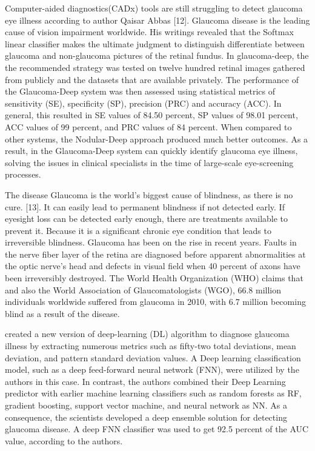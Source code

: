 \vspace{5mm}
\noindent Computer-aided diagnostics(CADx) tools are still struggling to detect glaucoma eye illness according to author Qaisar Abbas [12]. Glaucoma disease is the leading cause of vision impairment worldwide. His writings revealed that the Softmax linear classifier makes the ultimate judgment to distinguish differentiate between glaucoma and non-glaucoma pictures of the retinal fundus.  In glaucoma-deep, the the recommended strategy was tested on twelve hundred retinal images gathered from publicly and the datasets that are available privately. The performance of the Glaucoma-Deep system was then assessed using statistical metrics of sensitivity (SE), specificity (SP), precision (PRC) and accuracy (ACC). In general, this resulted in SE values of 84.50 percent, SP values of 98.01 percent, ACC values of 99 percent, and PRC values of 84 percent. When compared to other systems, the Nodular-Deep approach produced much better outcomes. As a result, in the Glaucoma-Deep system can quickly identify glaucoma eye illness, solving the issues in clinical specialists in the time of large-scale eye-screening processes.

\vspace{5mm}
\noindent The disease Glaucoma is the world's biggest cause of blindness, as there is no cure. [13]. It can easily lead to permanent blindness if not detected early. If eyesight loss can be detected early enough, there are treatments available to prevent it. Because it is a significant chronic eye condition that leads to irreversible blindness. Glaucoma has been on the rise in recent years. Faults in the nerve fiber layer of the retina are diagnosed before apparent abnormalities at the optic nerve's head and defects in visual field when 40 percent of axons have been irreversibly destroyed. The World Health Organization (WHO) claims that and also the World Association of Glaucomatologists (WGO), 66.8 million individuals worldwide suffered from glaucoma in 2010, with 6.7 million becoming blind as a result of the disease.

\vspace{5mm}
\noindent [6] created a new version of deep-learning (DL) algorithm to diagnose glaucoma illness by extracting numerous metrics such as fifty-two total deviations, mean deviation, and pattern standard deviation values. A Deep learning classification model, such as a deep feed-forward neural network (FNN), were utilized by the authors in this case. In contrast, the authors combined their Deep Learning predictor with earlier machine learning classifiers such as random forests as RF, gradient boosting, support vector machine, and neural network as NN. As a consequence, the scientists developed a deep ensemble solution for detecting glaucoma disease. A deep FNN classifier was used to get 92.5 percent of the AUC value, according to the authors.

